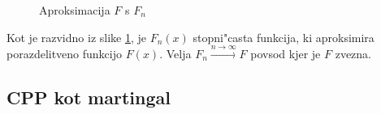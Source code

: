 \documentclass[12pt, a4paper, reqno]{amsart}
\theoremstyle{definition}
\theoremstyle{plain}
\newcommand{\R}{\mathbb{R}}
\newcommand{\Prob}{\mathbb{P}}
\newcommand{\1}{\mathds{1}}
\begin{document}
\begin{figure}[H]
\begin{center}
\begin{tikzpicture}
                
                
                \end{tikzpicture}
                \caption{Aproksimacija $F$ s $F_n$}
                \label{fig:slika2}
            \end{center}
        \end{figure}

    \noindent
    Kot je razvidno iz slike \ref{fig:slika2}, je $F_n(x)$ stopni"casta funkcija, ki aproksimira 
    porazdelitveno funkcijo $F(x)$. Velja $F_n \xrightarrow{n\to\infty}F$ povsod kjer je $F$ zvezna.



%
%
%
%
%
%
%
%

    \subsection{CPP kot martingal}
\end{document}
